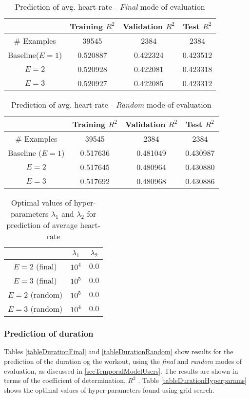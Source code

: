 \documentclass{acm_proc_article-sp}
\begin{document}
\begin{table}[h]
\centering
\begin{tabular}{|c|c|c|c|} \hline
& Training $R^2$ & Validation $R^2$ & Test $R^2$ \\ \hline
\# Examples & 39545 & 2384 & 2384  \\ \hline
Baseline($E = 1$)& 0.520887 & 0.422324 & 0.423512 \\ \hline
$E = 2$ & 0.520928 & 0.422081 & 0.423318 \\ \hline
$E = 3$ & 0.520927 & 0.422085 & 0.423312 \\ \hline
\end{tabular}
\caption{Prediction of avg. heart-rate - \emph{Final} mode of evaluation }
\label{tableAvgHrFinal}
\end{table}

\begin{table}[h]
\centering
\begin{tabular}{|c|c|c|c|} \hline
& Training $R^2$ & Validation $R^2$ & Test $R^2$ \\ \hline
\# Examples & 39545 & 2384  &  2384 \\ \hline
Baseline ($E = 1$) & 0.517636 & 0.481049 & 0.430987 \\ \hline
$E = 2$  & 0.517645 & 0.480964 & 0.430880 \\ \hline
$E = 3$  & 0.517692 & 0.480968 & 0.430886 \\ \hline
\end{tabular}
\caption{Prediction of avg. heart-rate - \emph{Random} mode of evaluation }
\label{tableAvgHrRandom}
\end{table}

\begin{table}[h]
\centering
\begin{tabular}{|c|c|c|} \hline
& $\lambda_1$ & $\lambda_2$ \\ \hline
$E = 2$ (final) & $10^4$ & $0.0$ \\ \hline
$E = 3$ (final) & $10^5$ & $0.0$ \\ \hline
$E = 2$ (random) & $10^5$ & $0.0$ \\ \hline
$E = 3$ (random) & $10^4$ & $0.0$ \\ \hline
\end{tabular}
\caption{Optimal values of hyper-parameters $\lambda_1$ and $\lambda_2$ for prediction of average heart-rate}
\label{tableAvgHrHyperparams}
\end{table}

\subsubsection{Prediction of duration}
Tables \ref{tableDurationFinal} and \ref{tableDurationRandom} show results for the prediction of the duration og the workout, using the  \emph{final} and \emph{random} modes of evaluation, as discussed in \ref{secTemporalModelUsers}. The results are shown in terms of the coefficient of determination, $R^2$ \cite{r2Wiki}. Table \ref{tableDurationHyperparams} shows the optimal values of hyper-parameters found using grid search.
\end{document}
